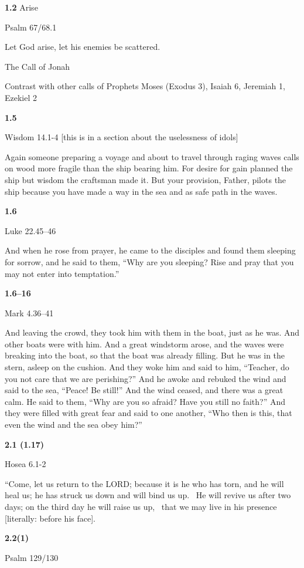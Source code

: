 \documentclass[
]{article}
\newcommand{\RL}[1]{\beginR #1\endR}
\begin{document}
\textbf{1.2} Arise

Psalm 67/68.1

Let God arise, let his enemies be scattered.

The Call of Jonah

Contrast with other calls of Prophets Moses (Exodus 3), Isaiah 6,
Jeremiah 1, Ezekiel 2

\textbf{1.5}

Wisdom 14.1-4 {[}this is in a section about the uselessness of idols{]}

Again someone preparing a voyage and about to travel through raging
waves calls on wood more fragile than the ship bearing him. For desire
for gain planned the ship but wisdom the craftsman made it. But your
provision, Father, pilots the ship because you have made a way in the
sea and as safe path in the waves.

\textbf{1.6}

Luke 22.45--46

And when he rose from prayer, he came to the disciples and found them
sleeping for sorrow, and he said to them, \RL{``}Why are you sleeping?
Rise and pray that you may not enter into temptation.''

\textbf{1.6--16}

Mark 4.36--41

And leaving the crowd, they took him with them in the boat, just as he
was. And other boats were with him. And a great windstorm arose, and the
waves were breaking into the boat, so that the boat was already filling.
But he was in the stern, asleep on the cushion. And they woke him and
said to him, \RL{``}Teacher, do you not care that we are perishing?''
And he awoke and rebuked the wind and said to the sea, \RL{``}Peace! Be
still!'' And the wind ceased, and there was a great calm. He said to
them, \RL{``}Why are you so afraid? Have you still no faith?'' And they
were filled with great fear and said to one another, \RL{``}Who then is
this, that even the wind and the sea obey him?''

\textbf{2.1 (1.17)}

Hosea 6.1-2

\RL{``}Come, let us return to the LORD; because it is he who has torn,
and he will heal us; he has struck us down and will bind us up. ~He will
revive us after two days; on the third day he will raise us up, ~that we
may live in his presence {[}literally: before his face{]}.

\textbf{2.2(1)}

Psalm 129/130
\end{document}
